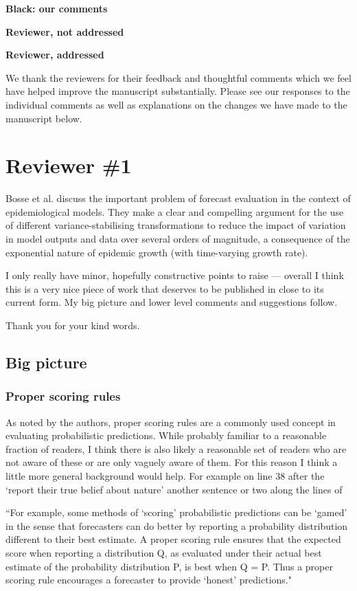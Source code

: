 \documentclass{article}
\newcommand{\red}{\color{red}}
\newcommand{\black}{\color{black}}
\newcommand{\blue}{\color{blue}}
\begin{document}
\black \textbf{Black: our comments}

\red \textbf{Reviewer, not addressed}

\blue \textbf{Reviewer, addressed}


\black
We thank the reviewers for their feedback and thoughtful comments which we feel have helped improve the manuscript substantially. Please see our responses to the individual comments as well as explanations on the changes we have made to the manuscript below. 


\section{Reviewer \#1}

\blue
Bosse et al. discuss the important problem of forecast evaluation in the context of epidemiological models. They make a clear and compelling argument for the use of different variance-stabilising transformations to reduce the impact of variation in model outputs and data over several orders of magnitude, a consequence of the exponential nature of epidemic growth (with time-varying growth rate).

I only really have minor, hopefully constructive points to raise — overall I think this is a very nice piece of work that deserves to be published in close to its current form. My big picture and lower level comments and suggestions follow.

\black
Thank you for your kind words.

\blue
\subsection{Big picture}
\subsubsection{Proper scoring rules}
As noted by the authors, proper scoring rules are a commonly used concept in evaluating probabilistic predictions. While probably familiar to a reasonable fraction of readers, I think there is also likely a reasonable set of readers who are not aware of these or are only vaguely aware of them. For this reason I think a little more general background would help. For example on line 38 after the ‘report their true belief about nature’ another sentence or two along the lines of

“For example, some methods of ‘scoring’ probabilistic predictions can be ‘gamed’ in the sense that forecasters can do better by reporting a probability distribution different to their best estimate. A proper scoring rule ensures that the expected score when reporting a distribution Q, as evaluated under their actual best estimate of the probability distribution P, is best when Q = P. Thus a proper scoring rule encourages a forecaster to provide ‘honest’ predictions."
\end{document}

